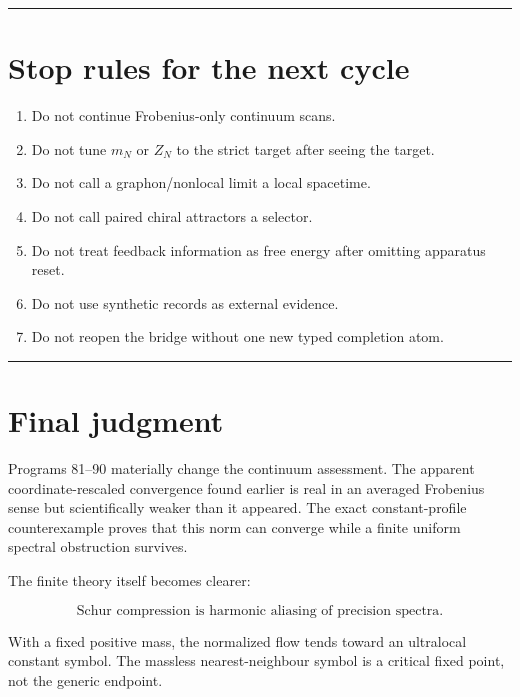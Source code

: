 \documentclass[11pt,a4paper,openany]{report}
\begin{document}
\par\medskip\hrule\medskip

\chapter{Stop rules for the next cycle}

\begin{enumerate}
\item 
Do not continue Frobenius-only continuum scans.

\item 
Do not tune \(m_N\) or \(Z_N\) to the strict target after seeing the target.

\item 
Do not call a graphon/\allowbreak{}nonlocal limit a local spacetime.

\item 
Do not call paired chiral attractors a selector.

\item 
Do not treat feedback information as free energy after omitting apparatus reset.

\item 
Do not use synthetic records as external evidence.

\item 
Do not reopen the bridge without one new typed completion atom.

\end{enumerate}

\par\medskip\hrule\medskip

\chapter{Final judgment}

Programs 81--90 materially change the continuum assessment. The apparent coordinate-rescaled convergence found earlier is real in an averaged Frobenius sense but scientifically weaker than it appeared. The exact constant-profile counterexample proves that this norm can converge while a finite uniform spectral obstruction survives.

The finite theory itself becomes clearer:

\[
\boxed{
\text{Schur compression is harmonic aliasing of precision spectra.}
}
\]

With a fixed positive mass, the normalized flow tends toward an ultralocal constant symbol. The massless nearest-neighbour symbol is a critical fixed point, not the generic endpoint.
\end{document}
